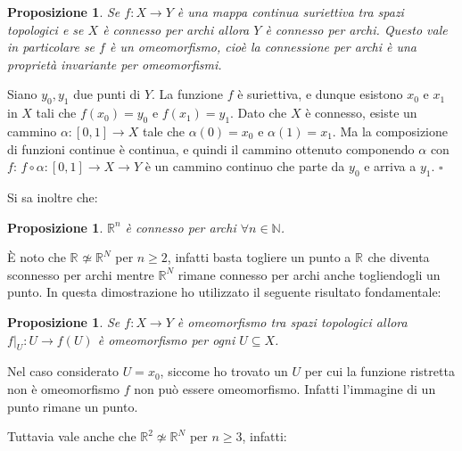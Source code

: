 \documentclass[10pt, twoside=false, x11names]{scrbook}
\newtheorem{proposition}[theorem]{Proposizione}
\newenvironment{proof}{{\textbf{Dimostrazione}:}}{\hfill $\square$}
\newcommand{\RN}[1][]{\mathbb{R}^#1}
\begin{document}
\begin{proposition}
  Se $ f:X \to Y $ è una mappa continua suriettiva tra spazi topologici e se $ X $ è connesso per archi
  allora $ Y $ è connesso per archi. Questo vale in particolare se $ f $ è un omeomorfismo, cioè la
  connessione per archi è una proprietà invariante per omeomorfismi.
\end{proposition}

\begin{proof}
  Siano $ y_0, y_1 $ due punti di $ Y $. La funzione $ f $ è suriettiva, e dunque esistono $ x_0 $ e $ x_1 $ in $ X $
  tali che $ f(x_0)=y_0 $ e $ f(x_1)=y_1 $. Dato che $ X $ è connesso, esiste un cammino $ \alpha:[0,1] \to X $ tale che $ \alpha(0)=x_0 $
  e $ \alpha(1)=x_1 $. Ma la composizione di funzioni continue è continua, e quindi il cammino ottenuto componendo $ \alpha $ con $ f $:
  $ f \circ \alpha : [0,1] \to X \to Y $ è un cammino continuo che parte da $ y_0 $ e arriva a $ y_1 $.
\end{proof}

Si sa inoltre che:
\begin{proposition}
  $ \RN{n} $ è connesso per archi $ \forall n \in \mathbb{N} $.
\end{proposition}

È noto che $ \RN{} \not \simeq \RN{N} $ per $ n \geq 2 $, infatti basta togliere un punto a $ \RN{} $ che diventa sconnesso per archi
mentre $ \RN{N} $ rimane connesso per archi anche togliendogli un punto. In questa dimostrazione ho utilizzato
il seguente risultato fondamentale:
\begin{proposition}
  Se $ f: X \to Y $ è omeomorfismo tra spazi topologici allora $ f \rvert_U : U \to f(U) $ è omeomorfismo per ogni $ U \subseteq X $.
\end{proposition}
Nel caso considerato $ U = {x_0} $, siccome ho trovato un $ U $ per cui la funzione ristretta non è omeomorfismo $ f $
non può essere omeomorfismo. Infatti l'immagine di un punto rimane un punto.

Tuttavia vale anche che $ \RN{2} \not \simeq \RN{N} $ per $ n \geq 3 $, infatti:
\end{document}

